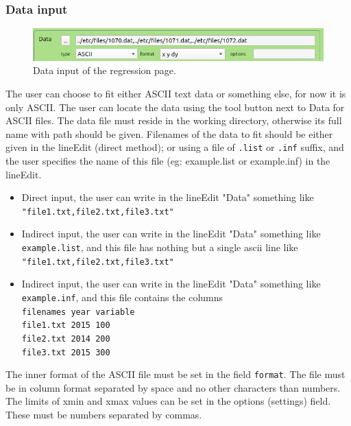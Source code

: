 \documentclass[10pt,letterpaper,oneside]{article}
\begin{document}
\subsubsection*{Data input}
\begin{figure}[!htb]
\includegraphics[width=\textwidth]{dataline.png}
 \caption{Data input of the regression page.}
 \label{fig-mag}
 \end{figure}
The user can choose to fit either ASCII text data or something else, for now it is only ASCII. The user can locate the data using the tool button next to Data for ASCII files. 
The data file must reside in the working directory, otherwise its full name with path should be given.
Filenames of the data to fit should be either given in the lineEdit (direct method); or using a file of \verb+.list+ or \verb+.inf+ suffix, and the user specifies the name of this file (eg: example.list or example.inf) in the lineEdit.  
\begin{itemize}
\item Direct input, the user can write in the lineEdit "Data" something like \verb+"file1.txt,file2.txt,file3.txt"+
\item Indirect input, the user can write in the lineEdit "Data" something like \verb+example.list+, and this file has nothing but a single ascii line like \verb+"file1.txt,file2.txt,file3.txt"+
\item Indirect input, the user can write in the lineEdit "Data" something like \verb+example.inf+, and this file contains the columns\\
\verb+filenames year variable+\\
\verb+file1.txt 2015 100+\\
\verb+file2.txt 2014 200+\\
\verb+file3.txt 2015 300+\\
\end{itemize}

The inner format of the ASCII file must be set in the field \verb+format+. The file must be in column format separated by space and no other characters than numbers. The limits of xmin and xmax values can be set in the options (settings) field. These must be numbers separated by commas.




\end{document}
